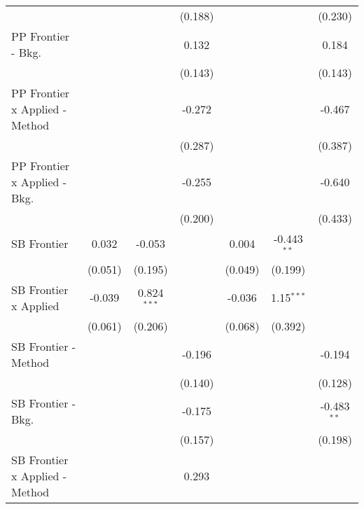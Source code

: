\begin{tabular}{lcccccc}
                                  &                &               & (0.188)       &                &               & (0.230)\\   
   PP Frontier - Bkg.             &                &               & 0.132         &                &               & 0.184\\   
                                  &                &               & (0.143)       &                &               & (0.143)\\   
   PP Frontier x Applied - Method &                &               & -0.272        &                &               & -0.467\\   
                                  &                &               & (0.287)       &                &               & (0.387)\\   
   PP Frontier x Applied - Bkg.   &                &               & -0.255        &                &               & -0.640\\   
                                  &                &               & (0.200)       &                &               & (0.433)\\   
   SB Frontier                    & 0.032          & -0.053        &               & 0.004          & -0.443$^{**}$ &   \\   
                                  & (0.051)        & (0.195)       &               & (0.049)        & (0.199)       &   \\   
   SB Frontier x Applied          & -0.039         & 0.824$^{***}$ &               & -0.036         & 1.15$^{***}$  &   \\   
                                  & (0.061)        & (0.206)       &               & (0.068)        & (0.392)       &   \\   
   SB Frontier - Method           &                &               & -0.196        &                &               & -0.194\\   
                                  &                &               & (0.140)       &                &               & (0.128)\\   
   SB Frontier - Bkg.             &                &               & -0.175        &                &               & -0.483$^{**}$\\   
                                  &                &               & (0.157)       &                &               & (0.198)\\   
   SB Frontier x Applied - Method &                &               & 0.293         &                &               &   \\   

\end{tabular}
